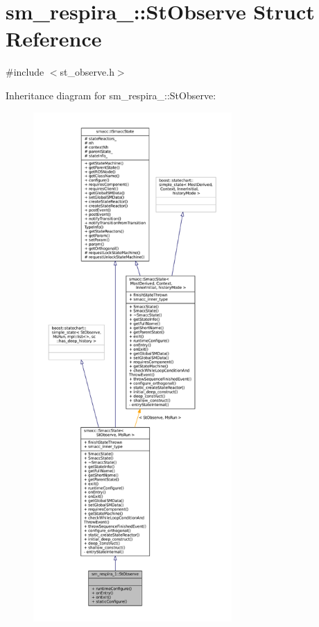 \hypertarget{structsm__respira__1_1_1StObserve}{}\section{sm\+\_\+respira\+\_\+:\+:St\+Observe Struct Reference}
\label{structsm__respira__1_1_1StObserve}


{\ttfamily \#include $<$st\+\_\+observe.\+h$>$}



Inheritance diagram for sm\+\_\+respira\+\_\+:\+:St\+Observe\+:
\nopagebreak
\begin{figure}[H]
\begin{center}
\leavevmode
\includegraphics[height=550pt]{structsm__respira__1_1_1StObserve__inherit__graph}
\end{center}
\end{figure}


